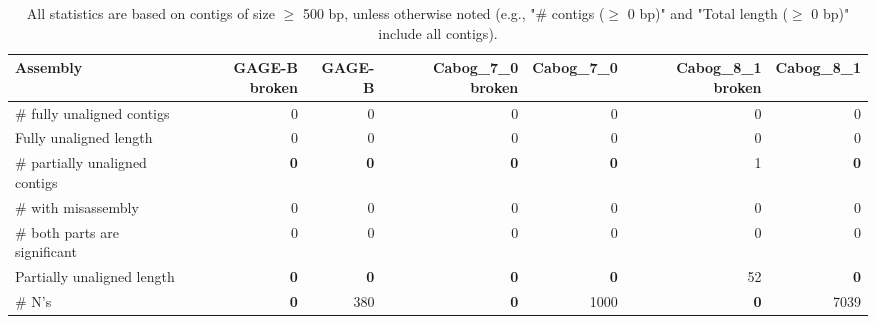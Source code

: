 \documentclass[12pt,a4paper]{article}
\begin{document}
\begin{table}[ht]
\begin{center}
\caption{All statistics are based on contigs of size $\geq$ 500 bp, unless otherwise noted (e.g., "\# contigs ($\geq$ 0 bp)" and "Total length ($\geq$ 0 bp)" include all contigs).}
\begin{tabular}{|l*{6}{|r}|}
\hline
Assembly & GAGE-B broken & GAGE-B & Cabog\_7\_0 broken & Cabog\_7\_0 & Cabog\_8\_1 broken & Cabog\_8\_1 \\ \hline
\# fully unaligned contigs & 0 & 0 & 0 & 0 & 0 & 0 \\ \hline
Fully unaligned length & 0 & 0 & 0 & 0 & 0 & 0 \\ \hline
\# partially unaligned contigs & {\bf 0} & {\bf 0} & {\bf 0} & {\bf 0} & 1 & {\bf 0} \\ \hline
\hspace{5mm}\# with misassembly & 0 & 0 & 0 & 0 & 0 & 0 \\ \hline
\hspace{5mm}\# both parts are significant & 0 & 0 & 0 & 0 & 0 & 0 \\ \hline
Partially unaligned length & {\bf 0} & {\bf 0} & {\bf 0} & {\bf 0} & 52 & {\bf 0} \\ \hline
\# N's & {\bf 0} & 380 & {\bf 0} & 1000 & {\bf 0} & 7039 \\ \hline
\end{tabular}
\end{center}
\end{table}
\end{document}
